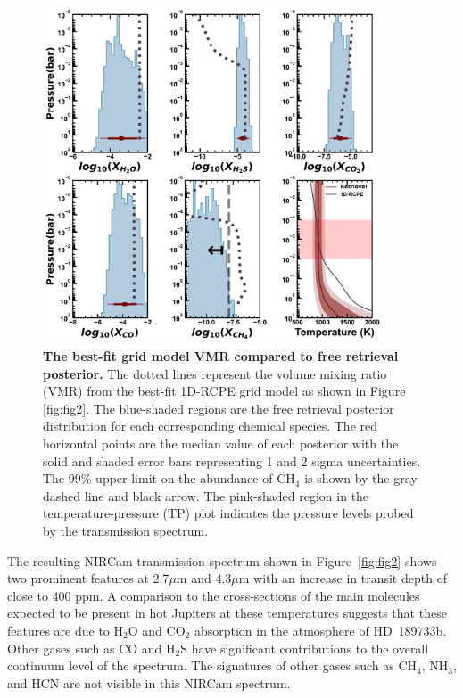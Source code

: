 \documentclass[sn-standardnature]{sn-jnl}%
\begin{document}
\begin{figure}
\centering
  \includegraphics[width=0.9\textwidth,keepaspectratio]{figs/Fig3.pdf}
  \caption{\textbf{The best-fit grid model VMR compared to free retrieval posterior.} The dotted lines represent the volume mixing ratio (VMR) from the best-fit 1D-RCPE grid model as shown in Figure \ref{fig:fig2}. The blue-shaded regions are the free retrieval posterior distribution for each corresponding chemical species. The red horizontal points are the median value of each posterior with the solid and shaded error bars representing 1 and 2 sigma uncertainties. The 99\% upper limit on the abundance of CH$_4$ is shown by the gray dashed line and black arrow. The pink-shaded region in the temperature-pressure (TP) plot indicates the pressure levels probed by the transmission spectrum.}
  \label{fig:fig3}
\end{figure}



The resulting NIRCam transmission spectrum shown in Figure~\ref{fig:fig2} shows two prominent features at 2.7$\mu$m and 4.3$\mu$m with an increase in transit depth of close to 400 ppm.  A comparison to the cross-sections of the main molecules expected to be present in hot Jupiters at these temperatures \cite{burrows_spectra_2014} suggests that these features are due to H$_2$O and CO$_2$ absorption in the atmosphere of HD~189733b. Other gases such as CO and H$_2$S have significant contributions to the overall continuum level of the spectrum. The signatures of other gases such as CH$_4$, NH$_3$, and HCN are not visible in this NIRCam spectrum.
\end{document}
